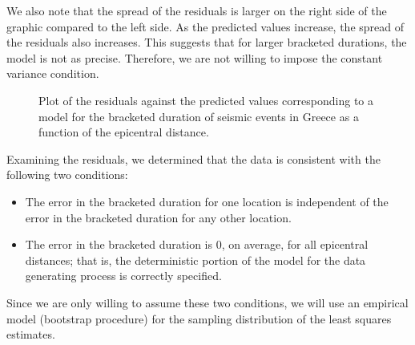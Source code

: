 \documentclass[
  letterpaper,
  DIV=11,
  numbers=noendperiod]{scrreprt}
\providecommand{\tightlist}{%
  \setlength{\itemsep}{0pt}\setlength{\parskip}{0pt}}\usepackage{longtable,booktabs,array}
\theoremstyle{definition}
\theoremstyle{definition}
\theoremstyle{plain}
\theoremstyle{remark}
\begin{document}
We also note that the spread of the residuals is larger on the right
side of the graphic compared to the left side. As the predicted values
increase, the spread of the residuals also increases. This suggests that
for larger bracketed durations, the model is not as precise. Therefore,
we are not willing to impose the constant variance condition.

\begin{figure}


\caption{\label{fig-regrecap-mean0}Plot of the residuals against the
predicted values corresponding to a model for the bracketed duration of
seismic events in Greece as a function of the epicentral distance.}

\end{figure}%

Examining the residuals, we determined that the data is consistent with
the following two conditions:

\begin{itemize}
\tightlist
\item
  The error in the bracketed duration for one location is independent of
  the error in the bracketed duration for any other location.
\item
  The error in the bracketed duration is 0, on average, for all
  epicentral distances; that is, the deterministic portion of the model
  for the data generating process is correctly specified.
\end{itemize}

Since we are only willing to assume these two conditions, we will use an
empirical model (bootstrap procedure) for the sampling distribution of
the least squares estimates.
\end{document}
